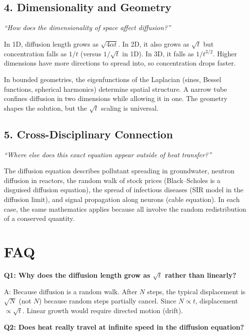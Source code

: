\documentclass[11pt,openright]{book}
\begin{document}
\subsection*{4. Dimensionality and Geometry}
\textit{``How does the dimensionality of space affect diffusion?''}

In 1D, diffusion length grows as $\sqrt{4\alpha t}$. In 2D, it also grows as $\sqrt{t}$ but concentration falls as $1/t$ (versus $1/\sqrt{t}$ in 1D). In 3D, it falls as $1/t^{3/2}$. Higher dimensions have more directions to spread into, so concentration drops faster.

In bounded geometries, the eigenfunctions of the Laplacian (sines, Bessel functions, spherical harmonics) determine spatial structure. A narrow tube confines diffusion in two dimensions while allowing it in one. The geometry shapes the solution, but the $\sqrt{t}$ scaling is universal.

\subsection*{5. Cross-Disciplinary Connection}
\textit{``Where else does this exact equation appear outside of heat transfer?''}

The diffusion equation describes pollutant spreading in groundwater, neutron diffusion in reactors, the random walk of stock prices (Black--Scholes is a disguised diffusion equation), the spread of infectious diseases (SIR model in the diffusion limit), and signal propagation along neurons (cable equation). In each case, the same mathematics applies because all involve the random redistribution of a conserved quantity.


\section*{FAQ}

\textbf{Q1: Why does the diffusion length grow as $\sqrt{t}$ rather than linearly?}

A: Because diffusion is a random walk. After $N$ steps, the typical displacement is $\sqrt{N}$ (not $N$) because random steps partially cancel. Since $N \propto t$, displacement $\propto \sqrt{t}$. Linear growth would require directed motion (drift).

\textbf{Q2: Does heat really travel at infinite speed in the diffusion equation?}
\end{document}
